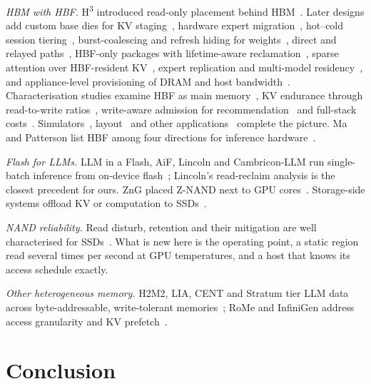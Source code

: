 \documentclass[conference,10pt]{IEEEtran}
\newcommand{\Hthree}{H\textsuperscript{3}}
\begin{document}
\textit{HBM with HBF.} \Hthree{} introduced read-only placement behind
HBM~\cite{ha2026h3}. Later designs add custom base dies for KV
staging~\cite{park2026pooling}, hardware expert migration~\cite{atassi2026hma},
hot--cold session tiering~\cite{baek2026hotcold}, burst-coalescing and refresh
hiding for weights~\cite{oliveira2026flint}, direct and relayed
paths~\cite{kim2026dash}, HBF-only packages with lifetime-aware
reclamation~\cite{zhong2026hbflex}, sparse attention over HBF-resident
KV~\cite{jonnalagadda2026splash}, expert replication and multi-model
residency~\cite{yin2026hbfapps}, and appliance-level provisioning of DRAM and
host bandwidth~\cite{xia2026moebox}. Characterisation studies examine HBF as main
memory~\cite{son2026exploring}, KV endurance through read-to-write
ratios~\cite{kyung2026hbfkv}, write-aware admission for
recommendation~\cite{peng2026grhbf} and full-stack costs~\cite{li2026hbfsucks}.
Simulators~\cite{hu2026hbfsim,li2026hbfsim}, layout~\cite{ju2026tilelens} and
other applications~\cite{hsu2026haven} complete the picture. Ma and Patterson list
HBF among four directions for inference hardware~\cite{ma2026challenges}.

\textit{Flash for LLMs.} LLM in a Flash, AiF, Lincoln and Cambricon-LLM run
single-batch inference from on-device
flash~\cite{alizadeh2024llmflash,lee2025aif,sun2025lincoln,yu2024cambriconllm};
Lincoln's read-reclaim analysis is the closest precedent for ours. ZnG placed
Z-NAND next to GPU cores~\cite{zhang2020zng}. Storage-side systems offload KV or
computation to SSDs~\cite{jeong2025hifc,pan2025instattention,jang2026hilos,jang2024smartinfinity}.

\textit{NAND reliability.} Read disturb, retention and their mitigation are well
characterised for SSDs~\cite{cai2015readdisturb,cai2017errors,luo2018heatwatch,liu2012retention}.
What is new here is the operating point, a static region read several times per
second at GPU temperatures, and a host that knows its access schedule exactly.

\textit{Other heterogeneous memory.} H2M2, LIA, CENT and Stratum tier LLM data
across byte-addressable, write-tolerant
memories~\cite{hwang2025h2m2,kim2025lia,gu2025cent,pan2025stratum}; RoMe and
InfiniGen address access granularity and KV
prefetch~\cite{nam2026rome,lee2024infinigen}.

\section{Conclusion}
\end{document}
